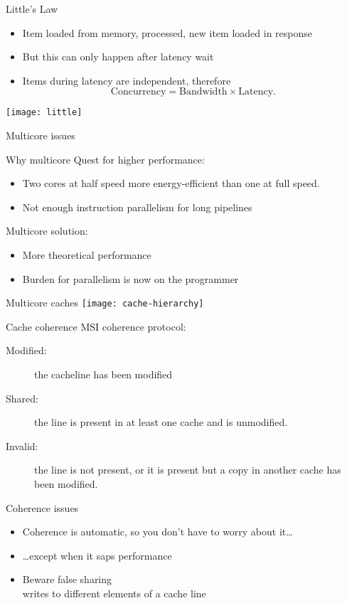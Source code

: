 \begin{frame}{Little's Law}
  \begin{itemize}
  \item Item loaded from memory, processed, new item loaded in response
  \item But this can only happen after latency wait
  \item Items during latency are independent, therefore
    \[ \mathrm{Concurrency}=\mathrm{Bandwidth}\times \mathrm{Latency}. \]
  \end{itemize}
  \texttt{[image: little]}
\end{frame}

 {Multicore issues}

\begin{frame}{Why multicore}
  Quest for higher performance:
  \begin{itemize}
  \item Two cores at half speed more energy-efficient than one at full speed.
  \item Not enough instruction parallelism for long pipelines
  \end{itemize}
  Multicore solution:
  \begin{itemize}
  \item More theoretical performance
  \item Burden for parallelism is now on the programmer
  \end{itemize}
\end{frame}

\begin{frame}{Multicore caches}
  \texttt{[image: cache-hierarchy]}
\end{frame}

\begin{frame}{Cache coherence}
\acf{MSI} coherence protocol:
\begin{description}
\item [Modified:] the cacheline has been modified
\item [Shared:] the line is present in at least one cache and is unmodified.
\item [Invalid:] the line is not present, or it
  is present but a copy in another cache has been modified.
\end{description}
\end{frame}

\begin{frame}[fragile]{Coherence issues}
  \begin{itemize}
  \item Coherence is automatic, so you don't have to worry about it\ldots
  \item \ldots except when it saps performance
  \item Beware false sharing\\
    writes to different elements of a cache line
  \end{itemize}
\end{frame}

